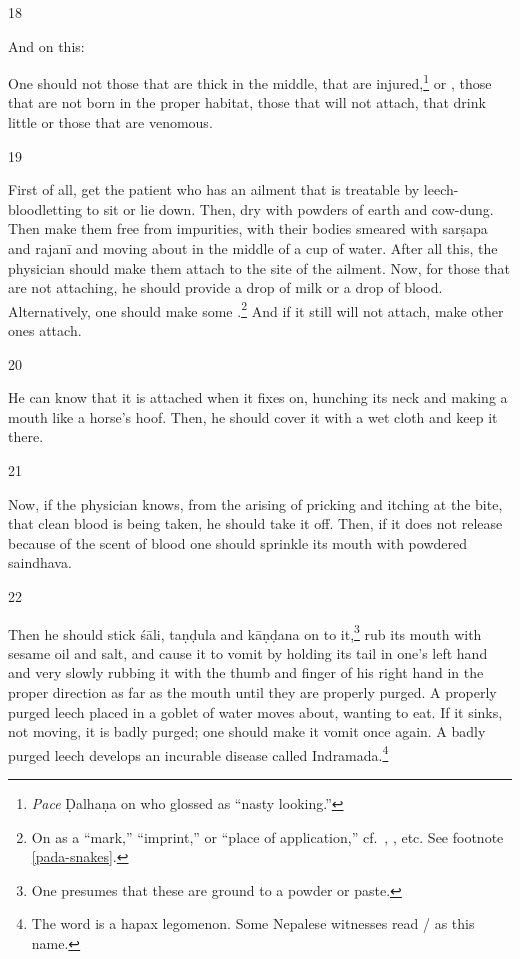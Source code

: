 \begin{translation}
\item[18]

And on this:

\begin{sloka}
    One should not  those that are thick in the middle, that
are injured,\footnote{\emph{Pace} Ḍalhaṇa on  who
    glossed  as “nasty looking.”} or , those
    that are not born in the proper habitat, those that will not attach, that
    drink little or those that are venomous.
\end{sloka}

\item[19] 

First of all, get the patient who has an ailment that is treatable by
leech-bloodletting to sit or lie down.  Then, dry  with powders of earth and cow-dung.  Then make them free from
impurities, with their bodies smeared with \gls{sarṣapa} and \gls{rajanī}
and moving about in the middle of a cup of water. After all this, the
physician should make them attach to the site of the ailment.  Now, for
those that are not attaching, he should provide a drop of milk or a drop of
blood. Alternatively, one should make some .\footnote{\label{pada-leeches}On  as a “mark,”
    “imprint,” or “place of application,” cf.\ ,
    , etc.  See footnote \ref{pada-snakes}.} And if it still
    will not attach, make other ones attach.

\item [20]
 
He can know that it is attached when it fixes on, hunching its neck and
making a mouth like a horse's hoof. Then, he should cover it with a wet
cloth and keep it there.
 
 \item[21]
 
Now, if the physician knows, from the arising of pricking and itching at the
bite, that clean blood is being taken, he should take it off.  Then,
if it does not release because of the scent of blood one should sprinkle its
mouth with powdered \gls{saindhava}.
    
\item[22]

Then he should stick \gls{śāli}, \gls{taṇḍula} and \gls{kāṇḍana} on to
it,\footnote{One presumes that these are ground to a powder or paste.} rub
    its mouth with sesame oil and salt, and cause it to vomit by holding its
    tail in one's left hand and very slowly rubbing it with the thumb and finger
    of his right hand in the proper direction as far as the mouth until they are
    properly purged.  A properly purged leech placed in a goblet of water moves
    about, wanting to eat.  If it sinks, not moving, it is badly purged; one
    should make it vomit once again.  A badly purged leech develops an incurable
    disease called Indramada.\footnote{The word  is a hapax
        legomenon.  Some Nepalese witnesses read 
        / as
        this name.}


\end{translation}
